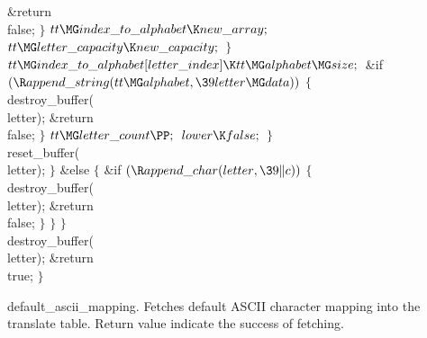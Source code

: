 \&{return} \\{false};\6
\4${}\}{}$\2\6
${}\\{tt}\MG\\{index\_to\_alphabet}\K\\{new\_array};{}$\6
${}\\{tt}\MG\\{letter\_capacity}\K\\{new\_capacity};{}$\6
\4${}\}{}$\2\6
${}\\{tt}\MG\\{index\_to\_alphabet}[\\{letter\_index}]\K\\{tt}\MG\\{alphabet}%
\MG\\{size};{}$\6
\&{if} ${}(\R\\{append\_string}(\\{tt}\MG\\{alphabet},\39\\{letter}\MG%
\\{data})){}$\5
${}\{{}$\1\6
\\{destroy\_buffer}(\\{letter});\6
\&{return} \\{false};\6
\4${}\}{}$\2\6
${}\\{tt}\MG\\{letter\_count}\PP;{}$\6
${}\\{lower}\K\\{false};{}$\6
\4${}\}{}$\2\6
\\{reset\_buffer}(\\{letter});\6
\4${}\}{}$\2\6
\&{else}\5
${}\{{}$\1\6
\&{if} ${}(\R\\{append\_char}(\\{letter},\39\|c)){}$\5
${}\{{}$\1\6
\\{destroy\_buffer}(\\{letter});\6
\&{return} \\{false};\6
\4${}\}{}$\2\6
\4${}\}{}$\2\6
\4${}\}{}$\2\6
\\{destroy\_buffer}(\\{letter});\6
\&{return} \\{true};\6
\4${}\}{}$\2\par
\fi

default\_ascii\_mapping.
Fetches default ASCII character mapping into the translate table. Return value
indicate the success of fetching.

